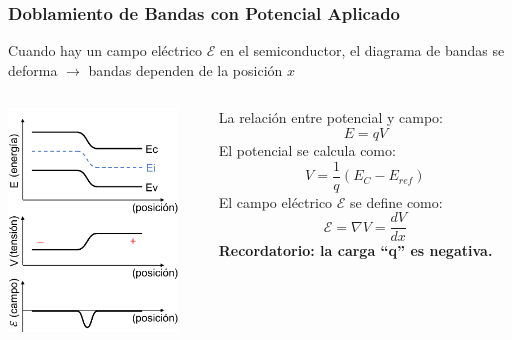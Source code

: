 \documentclass[10pt,t,aspectratio=169]{beamer}
\begin{document}
\begin{frame}[t]
    \frametitle{Doblamiento de Bandas con Potencial Aplicado}

    Cuando hay un campo eléctrico $\mathcal{E}$ en el semiconductor, el diagrama de bandas se deforma $\rightarrow$ bandas dependen de la posición $x$

    \begin{columns}
    
        \begin{column}{0.5\textwidth}
        
            \centering
            \includegraphics[width=4.5cm]{./figures/bandas-con-potencial.pdf}
            
        \end{column}
        
        \begin{column}{0.5\textwidth}
        
            La relación entre potencial y campo:
            \[ E = qV \]
            El potencial se calcula como:
            \[ V = \dfrac{1}{q} (E_C - E_{ref}) \]
            El campo eléctrico $\mathcal{E}$ se define como:
            \[ \mathcal{E} = \nabla{}V = \dfrac{dV}{dx} \]
            \textbf{Recordatorio: la carga ``q'' es negativa.}
            
        \end{column}
        
    \end{columns}
    
\end{frame}
\end{document}
